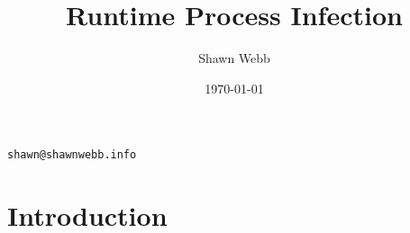 \documentclass[twocolumn]{article}
\begin{document}
\title{Runtime Process Infection}
\author{Shawn Webb}
\texttt{shawn@shawnwebb.info}
\date{\today}
\maketitle

\begin{abstract}

\end{abstract}

\section{Introduction}

\end{document}
